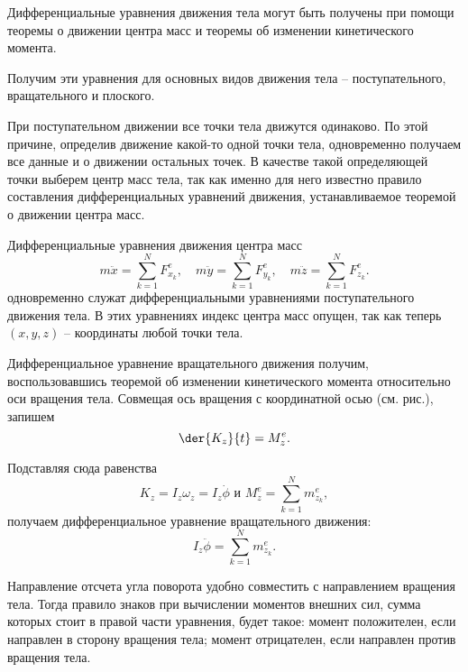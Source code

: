 Дифференциальные уравнения движения тела могут быть получены при помощи теоремы
о движении центра масс и теоремы об изменении кинетического момента.

Получим эти уравнения для основных видов движения тела -- поступательного,
вращательного и плоского.

При поступательном движении все точки тела движутся одинаково. По этой причине,
определив движение какой-то одной точки тела, одновременно получаем все данные и
о движении остальных точек. В качестве такой определяющей точки выберем центр
масс тела, так как именно для него известно правило составления дифференциальных
уравнений движения, устанавливаемое теоремой о движении центра масс.

Дифференциальные уравнения движения центра масс
\[
    m\ddot{x} = \sum_{k=1}^N F^e_{x_k},
    \quad m\ddot{y} = \sum_{k=1}^N F^e_{y_k},
    \quad m\ddot{z} = \sum_{k=1}^N F^e_{z_k}.
\] 
одновременно служат дифференциальными уравнениями поступательного движения тела.
В этих уравнениях индекс центра масс опущен, так как теперь \( (x, y, z) \) --
координаты любой точки тела.

Дифференциальное уравнение вращательного движения получим, воспользовавшись
теоремой об изменении кинетического момента относительно оси вращения тела.
Совмещая ось вращения с координатной осью (см. рис.), запишем
\[
    \der{K_z}{t} = M^e_z.
\]
 
Подставляя сюда равенства
\[
    K_z = I_z\omega_z = I_z\dot{\phi} \text{ и }
    M^e_z = \sum_{k=1}^N m^e_{z_k},
\]
получаем дифференциальное уравнение вращательного движения:
\[
    I_z\ddot{\phi} = \sum_{k=1}^N m^e_{z_k}.
\]
 
Направление отсчета угла поворота удобно совместить с направлением вращения
тела. Тогда правило знаков при вычислении моментов внешних сил, сумма которых
стоит в правой части уравнения, будет такое: момент положителен, если направлен
в сторону вращения тела; момент отрицателен, если направлен против вращения
тела.

\newpage
